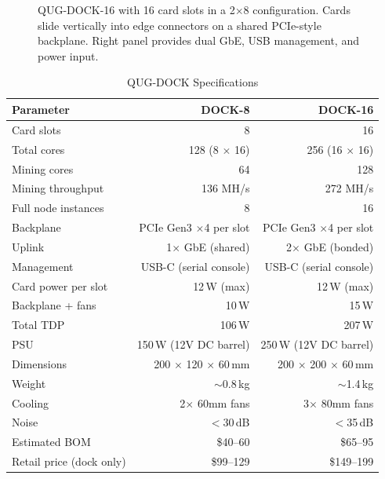 \documentclass[11pt,a4paper]{article}
\begin{document}
\begin{figure}[H]
\caption{QUG-DOCK-16 with 16 card slots in a 2$\times$8 configuration. Cards slide vertically into edge connectors on a shared PCIe-style backplane. Right panel provides dual GbE, USB management, and power input.}
\label{fig:dock16}
\end{figure}

\begin{table}[H]
\centering
\caption{QUG-DOCK Specifications}
\label{tab:dock}
\begin{tabular}{@{}lrr@{}}
\toprule
\textbf{Parameter} & \textbf{DOCK-8} & \textbf{DOCK-16} \\
\midrule
Card slots & 8 & 16 \\
Total cores & 128 (8 $\times$ 16) & 256 (16 $\times$ 16) \\
Mining cores & 64 & 128 \\
Mining throughput & 136 MH/s & 272 MH/s \\
Full node instances & 8 & 16 \\
\midrule
Backplane & PCIe Gen3 $\times$4 per slot & PCIe Gen3 $\times$4 per slot \\
Uplink & 1$\times$ GbE (shared) & 2$\times$ GbE (bonded) \\
Management & USB-C (serial console) & USB-C (serial console) \\
\midrule
Card power per slot & 12\,W (max) & 12\,W (max) \\
Backplane + fans & 10\,W & 15\,W \\
Total TDP & 106\,W & 207\,W \\
PSU & 150\,W (12V DC barrel) & 250\,W (12V DC barrel) \\
\midrule
Dimensions & 200 $\times$ 120 $\times$ 60\,mm & 200 $\times$ 200 $\times$ 60\,mm \\
Weight & $\sim$0.8\,kg & $\sim$1.4\,kg \\
Cooling & 2$\times$ 60mm fans & 3$\times$ 80mm fans \\
Noise & $<$30\,dB & $<$35\,dB \\
\midrule
Estimated BOM & \$40--60 & \$65--95 \\
Retail price (dock only) & \$99--129 & \$149--199 \\
\bottomrule
\end{tabular}
\end{table}
\end{document}
